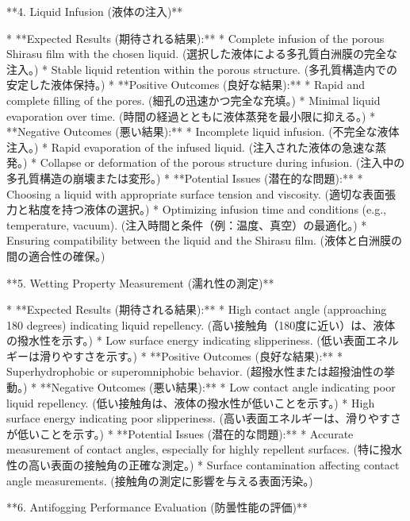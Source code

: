 \documentclass{article}
\begin{document}
**4. Liquid Infusion (液体の注入)**

*   **Expected Results (期待される結果):**
    *   Complete infusion of the porous Shirasu film with the chosen liquid. (選択した液体による多孔質白洲膜の完全な注入。)
    *   Stable liquid retention within the porous structure. (多孔質構造内での安定した液体保持。)
*   **Positive Outcomes (良好な結果):**
    *   Rapid and complete filling of the pores. (細孔の迅速かつ完全な充填。)
    *   Minimal liquid evaporation over time. (時間の経過とともに液体蒸発を最小限に抑える。)
*   **Negative Outcomes (悪い結果):**
    *   Incomplete liquid infusion. (不完全な液体注入。)
    *   Rapid evaporation of the infused liquid. (注入された液体の急速な蒸発。)
    *   Collapse or deformation of the porous structure during infusion. (注入中の多孔質構造の崩壊または変形。)
*   **Potential Issues (潜在的な問題):**
    *   Choosing a liquid with appropriate surface tension and viscosity. (適切な表面張力と粘度を持つ液体の選択。)
    *   Optimizing infusion time and conditions (e.g., temperature, vacuum). (注入時間と条件（例：温度、真空）の最適化。)
    *   Ensuring compatibility between the liquid and the Shirasu film. (液体と白洲膜の間の適合性の確保。)

**5. Wetting Property Measurement (濡れ性の測定)**

*   **Expected Results (期待される結果):**
    *   High contact angle (approaching 180 degrees) indicating liquid repellency. (高い接触角（180度に近い）は、液体の撥水性を示す。)
    *   Low surface energy indicating slipperiness. (低い表面エネルギーは滑りやすさを示す。)
*   **Positive Outcomes (良好な結果):**
    *   Superhydrophobic or superomniphobic behavior. (超撥水性または超撥油性の挙動。)
*   **Negative Outcomes (悪い結果):**
    *   Low contact angle indicating poor liquid repellency. (低い接触角は、液体の撥水性が低いことを示す。)
    *   High surface energy indicating poor slipperiness. (高い表面エネルギーは、滑りやすさが低いことを示す。)
*   **Potential Issues (潜在的な問題):**
    *   Accurate measurement of contact angles, especially for highly repellent surfaces. (特に撥水性の高い表面の接触角の正確な測定。)
    *   Surface contamination affecting contact angle measurements. (接触角の測定に影響を与える表面汚染。)

**6. Antifogging Performance Evaluation (防曇性能の評価)**
\end{document}
